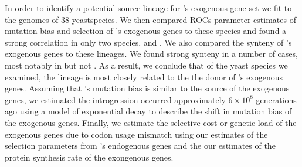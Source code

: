 \documentclass[12pt]{article}
\begin{document}
In order to identify a potential source lineage for \Klu's exogenous gene set we fit \ROC to the genomes of 38 yeastspecies.
We then compared ROCs parameter estimates of mutation bias and selection of \Klu's exogenous genes to these species and found a strong correlation in only two species, \gossypii and \dubl.
We also compared the synteny of \Klu's exogenous genes to these lineages.
We found strong synteny in a number of cases, most notably in \gossypii but not \dubl.
As a result, we conclude that of the yeast species we examined, the \gossypii lineage is most closely related to the the donor of \Klu's exogenous genes.
Assuming that \gossypii's mutation bias is similar to the source of the exogenous genes, we estimated the introgression occurred approximately $6 \times 10^8$ generations ago using a model of exponential decay to describe the  shift in mutation bias of the exogenous genes.
Finally, we estimate the selective cost or genetic load of the exogenous genes due to codon usage mismatch using our estimates of the selection parameters from \Klu's endogenous genes and the our estimates of the protein synthesis rate of the exongenous genes.
\end{document}
